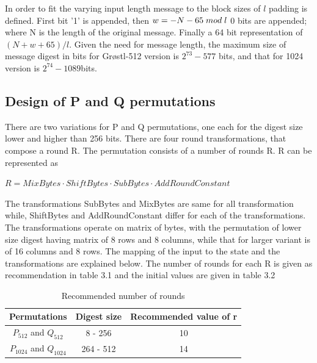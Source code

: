   In order to fit the varying input length message to the block sizes of $ l $ padding is defined. First bit '1' is
  appended, then $ w = -N - 65 \thickspace mod \thickspace l $ 0 bits are appended; where N is the length of the
  original message. Finally a 64 bit representation of $(N + w + 65) / l $. Given the need for message length, the
  maximum size of message digest in bits for Gr{\o}stl-512 version is $2^{73}-577$ bits, and that for 1024 version
  is $2^{74}-1089$bits.

  \subsection{Design of P and Q permutations}

  There are two variations for P and Q permutations, one each for the digest size lower and higher than 256 bits. There
  are four round transformations, that compose a round R. The permutation consists of a number of rounds R. R can be
  represented as 
  \begin{center}$ R = MixBytes \cdot ShiftBytes \cdot SubBytes \cdot AddRoundConstant $ \end{center}
  The transformations SubBytes and MixBytes are same for all transformation while, ShiftBytes and AddRoundConstant differ
  for each of the transformations. The transformations operate on matrix of bytes, with the permutation of lower size
  digest having matrix of 8 rows and 8 columns, while that for larger variant is of 16 columns and 8 rows. The mapping of
  the input to the state and the transformations are explained below. The number of rounds for each R is given as 
  recommendation in table 3.1 and the initial values are given in table 3.2
  
  \begin{table}
    \begin{center}
      \begin{tabular}{ *{3}{c} } \hline
        Permutations            & Digest size & Recommended value of r \\ \hline
        $P_{512}$ and $Q_{512}$   & 8 - 256     & 10 \\
        $P_{1024}$ and $Q_{1024}$ & 264 - 512   & 14 \\ \hline 
      \end{tabular}
      \caption{Recommended number of rounds \cite{00019}}
    \end{center}
  \end{table}


